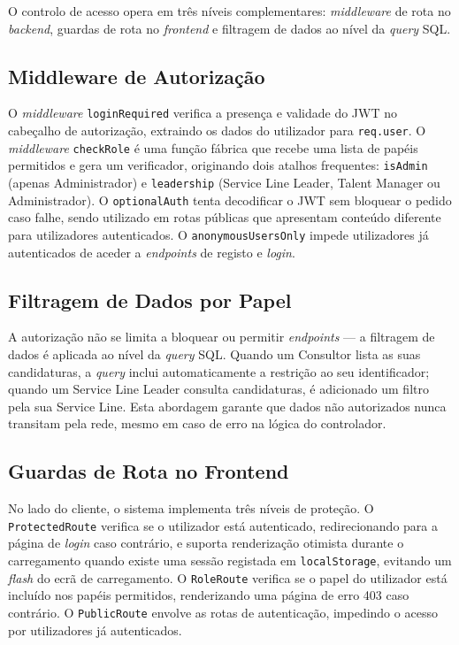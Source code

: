 \documentclass[12pt,a4paper]{report}
\begin{document}
O controlo de acesso opera em três níveis complementares: \textit{middleware} de rota no \textit{backend}, guardas de rota no \textit{frontend} e filtragem de dados ao nível da \textit{query} SQL.

\subsection{Middleware de Autorização}

O \textit{middleware} \texttt{loginRequired} verifica a presença e validade do JWT no cabeçalho de autorização, extraindo os dados do utilizador para \texttt{req.user}. O \textit{middleware} \texttt{checkRole} é uma função fábrica que recebe uma lista de papéis permitidos e gera um verificador, originando dois atalhos frequentes: \texttt{isAdmin} (apenas Administrador) e \texttt{leadership} (Service Line Leader, Talent Manager ou Administrador). O \texttt{optionalAuth} tenta decodificar o JWT sem bloquear o pedido caso falhe, sendo utilizado em rotas públicas que apresentam conteúdo diferente para utilizadores autenticados. O \texttt{anonymousUsersOnly} impede utilizadores já autenticados de aceder a \textit{endpoints} de registo e \textit{login}.

\subsection{Filtragem de Dados por Papel}

A autorização não se limita a bloquear ou permitir \textit{endpoints} --- a filtragem de dados é aplicada ao nível da \textit{query} SQL. Quando um Consultor lista as suas candidaturas, a \textit{query} inclui automaticamente a restrição ao seu identificador; quando um Service Line Leader consulta candidaturas, é adicionado um filtro pela sua Service Line. Esta abordagem garante que dados não autorizados nunca transitam pela rede, mesmo em caso de erro na lógica do controlador.

\subsection{Guardas de Rota no Frontend}

No lado do cliente, o sistema implementa três níveis de proteção. O \texttt{ProtectedRoute} verifica se o utilizador está autenticado, redirecionando para a página de \textit{login} caso contrário, e suporta renderização otimista durante o carregamento quando existe uma sessão registada em \texttt{localStorage}, evitando um \textit{flash} do ecrã de carregamento. O \texttt{RoleRoute} verifica se o papel do utilizador está incluído nos papéis permitidos, renderizando uma página de erro 403 caso contrário. O \texttt{PublicRoute} envolve as rotas de autenticação, impedindo o acesso por utilizadores já autenticados.
\end{document}
